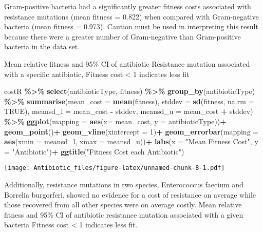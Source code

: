 \documentclass[
]{article}
\newenvironment{Shaded}{\begin{snugshade}}{\end{snugshade}}
\newcommand{\AttributeTok}[1]{\textcolor[rgb]{0.13,0.29,0.53}{#1}}
\newcommand{\ConstantTok}[1]{\textcolor[rgb]{0.56,0.35,0.01}{#1}}
\newcommand{\DecValTok}[1]{\textcolor[rgb]{0.00,0.00,0.81}{#1}}
\newcommand{\FunctionTok}[1]{\textcolor[rgb]{0.13,0.29,0.53}{\textbf{#1}}}
\newcommand{\NormalTok}[1]{#1}
\newcommand{\SpecialCharTok}[1]{\textcolor[rgb]{0.81,0.36,0.00}{\textbf{#1}}}
\newcommand{\StringTok}[1]{\textcolor[rgb]{0.31,0.60,0.02}{#1}}
\begin{document}
Gram-positive bacteria had a significantly greater fitness costs
associated with resistance mutations (mean fitness = 0.822) when
compared with Gram-negative bacteria (mean fitness = 0.973). Caution
must be used in interpreting this result because there were a greater
number of Gram-negative than Gram-positive bacteria in the data set.

Mean relative fitness and 95\% CI of antibiotic Resistance mutation
associated with a specific antibiotic, Fitness cost \textless{} 1
indicates less fit

\begin{Shaded}
\begin{Highlighting}[]
\NormalTok{costR }\SpecialCharTok{\%\textgreater{}\%} 
  \FunctionTok{select}\NormalTok{(antibioticType, fitness) }\SpecialCharTok{\%\textgreater{}\%} 
  \FunctionTok{group\_by}\NormalTok{(antibioticType) }\SpecialCharTok{\%\textgreater{}\%} 
  \FunctionTok{summarise}\NormalTok{(}\AttributeTok{mean\_cost =} \FunctionTok{mean}\NormalTok{(fitness),}
            \AttributeTok{stddev =} \FunctionTok{sd}\NormalTok{(fitness, }\AttributeTok{na.rm =} \ConstantTok{TRUE}\NormalTok{),}
            \AttributeTok{meansd\_l =}\NormalTok{ mean\_cost }\SpecialCharTok{{-}}\NormalTok{ stddev,}
            \AttributeTok{meansd\_u =}\NormalTok{ mean\_cost }\SpecialCharTok{+}\NormalTok{ stddev) }\SpecialCharTok{\%\textgreater{}\%} 
  \FunctionTok{ggplot}\NormalTok{(}\AttributeTok{mapping =} \FunctionTok{aes}\NormalTok{(}\AttributeTok{x=}\NormalTok{ mean\_cost, }\AttributeTok{y =}\NormalTok{ antibioticType))}\SpecialCharTok{+}
  \FunctionTok{geom\_point}\NormalTok{()}\SpecialCharTok{+}
  \FunctionTok{geom\_vline}\NormalTok{(}\AttributeTok{xintercept =} \DecValTok{1}\NormalTok{)}\SpecialCharTok{+}
  \FunctionTok{geom\_errorbar}\NormalTok{(}\AttributeTok{mapping =} \FunctionTok{aes}\NormalTok{(}\AttributeTok{xmin =}\NormalTok{ meansd\_l, }\AttributeTok{xmax =}\NormalTok{ meansd\_u))}\SpecialCharTok{+}
  \FunctionTok{labs}\NormalTok{(}\AttributeTok{x =} \StringTok{"Mean Fitness Cost"}\NormalTok{, }\AttributeTok{y =} \StringTok{"Antibiotic"}\NormalTok{)}\SpecialCharTok{+}
  \FunctionTok{ggtitle}\NormalTok{(}\StringTok{"Fitness Cost each Antibiotic"}\NormalTok{)}
\end{Highlighting}
\end{Shaded}

\texttt{[image: Antibiotic\_files/figure-latex/unnamed-chunk-8-1.pdf]}

Additionally, resistance mutations in two species, Enterococcus faecium
and Borrelia burgorferi, showed no evidence for a cost of resistance on
average while those recovered from all other species were on average
costly. Mean relative fitness and 95\% CI of antibiotic resistance
mutation associated with a given bacteria Fitness cost \textless{} 1
indicates less fit.
\end{document}
